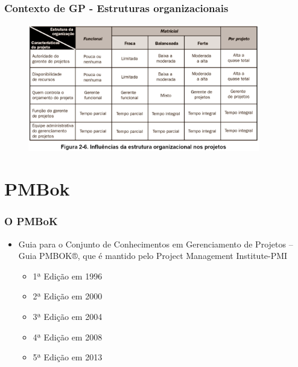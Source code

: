     \begin{frame}
 \frametitle{Contexto de GP - Estruturas organizacionais}
 \begin{figure}
  \centering
  \includegraphics[width = 0.9\textwidth]{figs/fig11.png}
 \end{figure}
\end{frame}

\section{PMBok}

  \begin{frame}
   \frametitle{O PMBoK}
   \begin{itemize}
    \item Guia para o Conjunto de Conhecimentos em Gerenciamento de Projetos – Guia  PMBOK®, que é mantido pelo Project Management Institute-PMI
    \begin{itemize}
     \item 1ª Edição em 1996
     \item 2ª Edição em 2000
     \item 3ª Edição em 2004
     \item 4ª Edição em 2008
     \item 5ª Edição em 2013
    \end{itemize}

   \end{itemize}
  \end{frame}
  
